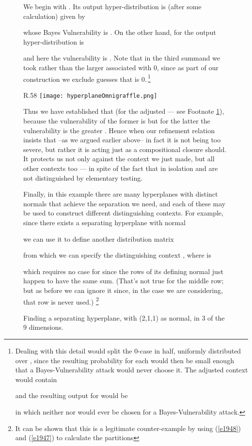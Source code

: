 \documentclass[runningheads]{llncs}
\newcommand\Eqn[1] {(\ref{#1})}
\newenvironment{Figure}[2][t]{\begin{figure}[#1]\def\Label{#2}\small}{\label{\Label}\end{figure}}
\begin{document}
\begin{Figure}[ht!]{f1228}
We begin with . Its output hyper-distribution is (after some calculation) given by

whose Bayes Vulnerability is .
On the other hand, for  the output hyper-distribution is

and here the vulnerability is . Note that in the third summand we took  rather than the larger  associated with 0, since as part of our construction we exclude guesses that  is 0.\,\footnote{\label{fn1223}Dealing with this detail would split the 0-case in half, uniformly distributed over , since the resulting probability  for each would then be small enough that a Bayes-Vulnerability attack would never choose it. The adjusted context  would contain

and the resulting output for  would be

in which neither  nor  would ever be chosen for a Bayes-Vulnerability attack.
}


\begin{wrapfigure}[18]{R}{.58\textwidth}
\texttt{[image: hyperplaneOmnigraffle.png]}
\caption{Finding a separating hyperplane, with (2,1,1) as normal, in 3 of the 9 dimensions.}\label{f1854}
\end{wrapfigure}
Thus we have established that  (for the adjusted  --- see Footnote \ref{fn1223}), because the vulnerability of the former is  but for the latter the vulnerability is the greater . Hence when our refinement relation insists that  --as we argued earlier above-- in fact it is not being too severe, but rather it is acting just as a compositional closure should. It protects us not only against the context  we just made, but all other contexts too --- in spite of the fact that in isolation  and  are not distinguished by elementary testing.

Finally, in this example there are many hyperplanes with distinct normals that achieve the separation we need, and each of these may be used to construct different distinguishing contexts. For example, since there exists a separating hyperplane with normal

we can use it to define another distribution matrix

from which we can specify the distinguishing context , where  is

which requires no   case for  since the rows of its defining normal just happen to have the same sum. (That's not true for the middle row; but as before we can ignore it since, in the  case we are considering, that row is never used.)
\footnote{It can be shown that this is a legitimate counter-example by using  \Eqn{e1948} and \Eqn{e1947} to calculate the partitions

}
\end{Figure}
\end{document}
